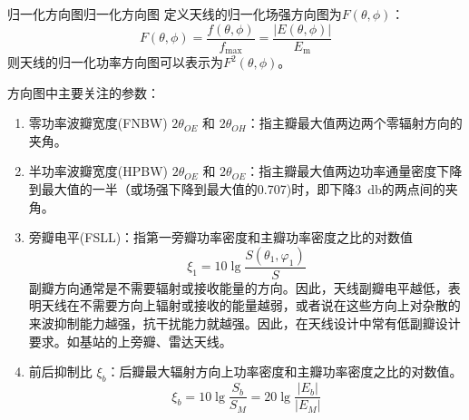     \begin{corollary}{归一化方向图}{归一化方向图}
        定义天线的归一化场强方向图为$F(\theta,\phi)$：
        \begin{equation}
            F(\theta,\phi)
            =\frac{f(\theta,\phi)}{f_\mathrm{max}}
            =\frac{|E(\theta,\phi)|}{E_\mathrm{m}}
        \end{equation}
        则天线的归一化功率方向图可以表示为$F^2(\theta,\phi)$。
    \end{corollary}


        
        方向图中主要关注的参数：
        \begin{enumerate}
            \item 零功率波瓣宽度(FNBW) $2\theta_{OE}$ 和 $2\theta_{OH}$：指主瓣最大值两边两个零辐射方向的夹角。
            \item 半功率波瓣宽度(HPBW) $2\theta_{OE}$ 和 $2\theta_{OE}$：指主瓣最大值两边功率通量密度下降到最大值的一半（或场强下降到最大值的0.707)时，即下降\SI{3}{\decibel}的两点间的夹角。
            \item 旁瓣电平(FSLL)：指第一旁瓣功率密度和主瓣功率密度之比的对数值
                \begin{equation}
                    \xi_1=10\lg\frac{S(\theta_1,\varphi_1)}{S} 
                \end{equation}
            副瓣方向通常是不需要辐射或接收能量的方向。因此，天线副瓣电平越低，表明天线在不需要方向上辐射或接收的能量越弱，或者说在这些方向上对杂散的来波抑制能力越强，抗干扰能力就越强。因此，在天线设计中常有低副瓣设计要求。如基站的上旁瓣、雷达天线。
            
            \item 前后抑制比 $\xi_b$：后瓣最大辐射方向上功率密度和主瓣功率密度之比的对数值。
                \begin{equation}
                    \xi_b=10\lg\frac{S_b}{S_M}=20\lg\frac{|E_b|}{|E_M|}
                \end{equation}
        \end{enumerate}

